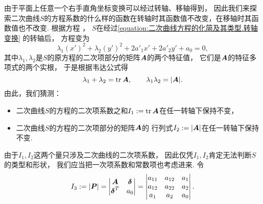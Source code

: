 由于平面上任意一个右手直角坐标变换可以经过转轴、移轴得到，
因此我们来探索二次曲线\(S\)的方程系数的什么样的函数在转轴时其函数值不改变，在移轴时其函数值也不改变.
根据方程 ，
\(S\)在经过\cref{equation:二次曲线方程的化简及其类型.转轴变换} 的转轴后，
方程变为\begin{equation*}
	\lambda_1 (x')^2 + \lambda_2 (y')^2 + 2 a'_1 x' + 2 a'_2 y' + a_ 0 = 0,
\end{equation*}
其中\(\lambda_1,\lambda_2\)是\(S\)的原方程的二次项部分的矩阵\(\boldsymbol{A}\)的两个特征值，
它们是\(\boldsymbol{A}\)的特征多项式的两个实根，
于是根据韦达公式得\begin{equation*}
	\lambda_1 + \lambda_2 = \tr\boldsymbol{A},
	\qquad
	\lambda_1 \lambda_2 = \abs{\boldsymbol{A}}.
\end{equation*}
由此，我们猜测：\begin{itemize}
	\item 二次曲线\(S\)的方程的二次项系数之和\(I_1 := \tr\boldsymbol{A}\)在任一转轴下保持不变，
	\item 二次曲线\(S\)的方程的二次项部分的矩阵\(\boldsymbol{A}\)的
	行列式\(I_2 := \abs{\boldsymbol{A}}\)在任一转轴下保持不变.
\end{itemize}

由于\(I_1,I_2\)这两个量只涉及二次曲线的二次项系数，
因此仅凭\(I_1,I_2\)肯定无法判断\(S\)的类型和形状，
我们应当把一次项系数和常数项也考虑进来.
令\begin{equation*}
	I_3 := \abs{\boldsymbol{P}}
	= \begin{vmatrix}
		\boldsymbol{A} & \boldsymbol\delta \\
		\boldsymbol\delta^T & a_0
	\end{vmatrix}
	= \begin{vmatrix}
		a_{11} & a_{12} & a_1 \\
		a_{12} & a_{22} & a_2 \\
		a_1 & a_2 & a_0
	\end{vmatrix}.
\end{equation*}


